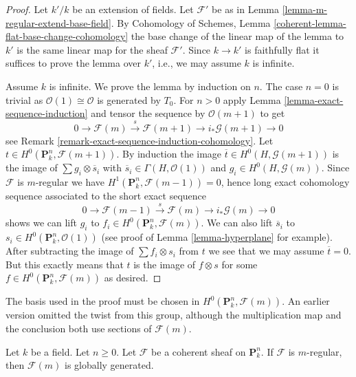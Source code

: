 \begin{proof}
Let $k'/k$ be an extension of fields. Let $\mathcal{F}'$
be as in Lemma \ref{lemma-m-regular-extend-base-field}. By
Cohomology of Schemes, Lemma \ref{coherent-lemma-flat-base-change-cohomology}
the base change of the linear map of the lemma to $k'$ is the
same linear map for the sheaf $\mathcal{F}'$. Since $k \to k'$
is faithfully flat it suffices to prove the lemma over $k'$, i.e.,
we may assume $k$ is infinite.

\medskip\noindent
Assume $k$ is infinite. We prove the lemma by induction on $n$.
The case $n = 0$ is trivial as $\mathcal{O}(1) \cong \mathcal{O}$
is generated by $T_0$. For $n > 0$ apply
Lemma \ref{lemma-exact-sequence-induction}
and tensor the sequence by $\mathcal{O}(m + 1)$ to get
$$
0 \to \mathcal{F}(m) \xrightarrow{s} \mathcal{F}(m + 1) \to
i_*\mathcal{G}(m + 1) \to 0
$$
see Remark \ref{remark-exact-sequence-induction-cohomology}.
Let $t \in H^0(\mathbf{P}^n_k, \mathcal{F}(m + 1))$.
By induction the image $\overline{t} \in H^0(H, \mathcal{G}(m + 1))$
is the image of $\sum g_i \otimes \overline{s}_i$ with
$\overline{s}_i \in \Gamma(H, \mathcal{O}(1))$ and
$g_i \in H^0(H, \mathcal{G}(m))$. Since $\mathcal{F}$ is $m$-regular
we have $H^1(\mathbf{P}^n_k, \mathcal{F}(m - 1)) = 0$, hence long
exact cohomology sequence associated to the short exact sequence
$$
0 \to \mathcal{F}(m - 1) \xrightarrow{s} \mathcal{F}(m) \to
i_*\mathcal{G}(m) \to 0
$$
shows we can lift $g_i$ to $f_i \in H^0(\mathbf{P}^n_k, \mathcal{F}(m))$.
We can also lift $\overline{s}_i$ to
$s_i \in H^0(\mathbf{P}^n_k, \mathcal{O}(1))$ (see proof of
Lemma \ref{lemma-hyperplane} for example). After subtracting the
image of $\sum f_i \otimes s_i$ from $t$ we see that we may assume
$\overline{t} = 0$. But this exactly means that $t$ is the
image of $f \otimes s$ for some $f \in H^0(\mathbf{P}^n_k, \mathcal{F}(m))$
as desired.
\end{proof}

\begin{lemma}
\label{lemma-m-regular-globally-generated}
\begin{history}
The basis used in the proof must be chosen in
$H^0(\mathbf{P}^n_k, \mathcal{F}(m))$. An earlier version omitted the
twist from this group, although the multiplication map and the conclusion
both use sections of $\mathcal{F}(m)$.
\end{history}
Let $k$ be a field. Let $n \geq 0$.
Let $\mathcal{F}$ be a coherent sheaf on $\mathbf{P}^n_k$.
If $\mathcal{F}$ is $m$-regular, then $\mathcal{F}(m)$ is
globally generated.
\end{lemma}

